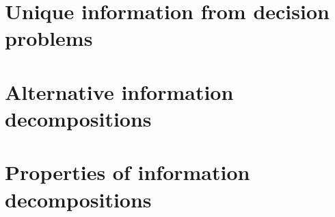 \documentclass{article}
\begin{document}
\section{Unique information from decision problems}
\label{sec:UIBROJA}

\section{Alternative information decompositions}
\label{sec:alt_infodeco}

\section{Properties of information decompositions}
\label{sec:properties}



\end{document}
